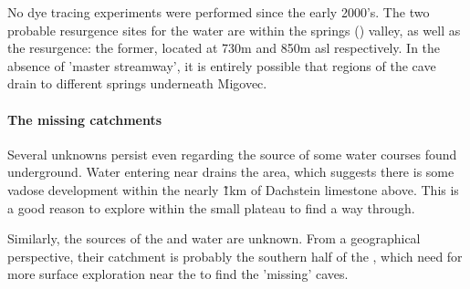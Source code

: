 No dye tracing experiments were performed since the early 2000's. The two probable resurgence sites for the  water are within the  springs () valley, as well as the  resurgence: the former, located at 730m and 850m asl respectively. In the absence of 'master streamway', it is entirely possible that regions of the cave drain to different springs underneath Migovec. 

\paragraph{The missing catchments}
Several unknowns persist even regarding the source of some water courses found underground. Water entering near  drains the  area, which suggests there is some vadose development within the nearly \~1km of Dachstein limestone above. This is a good reason to explore within the small  plateau to find a way through. 

Similarly, the sources of the  and  water are unknown. From a geographical perspective, their catchment is probably the southern half of the , which need for more surface exploration near the  to find the 'missing' caves. 


